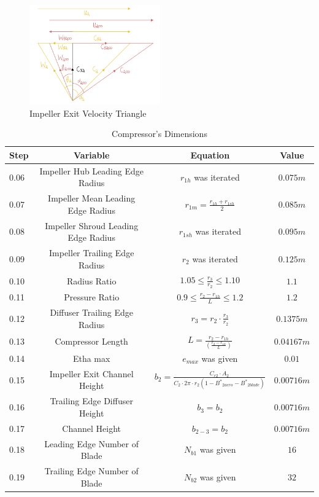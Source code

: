 \documentclass[12pt, letter]{report}
\begin{document}
\begin{figure}[H]
    \centering
    \includegraphics[width=0.5\textwidth]{figures/Impeller Exit Velocity Triangle.png}
    \caption{Impeller Exit Velocity Triangle \cite{lectureslides}}
    \label{fig:ImpellerExitVelocityTriangle}
\end{figure}

\begin{table}[H]
    \centering
    \caption{Compressor's Dimensions  \cite{lectureslides}}
    \begin{tabular}{|l|c|c|c|} \hline 
          \textbf{Step} &\textbf{Variable}&  \textbf{Equation}& \textbf{Value}\\ \hline 
         0.06&  Impeller Hub Leading Edge Radius&  $r_{1h}$ was iterated& $0.075m$\\ \hline 
         0.07&  Impeller Mean Leading Edge Radius&  $r_{1m}=\frac{r_{1h}+r_{1sh}}{2}$& $0.085m$\\ \hline 
         0.08&  Impeller Shroud Leading Edge Radius&  $r_{1sh}$ was iterated& $0.095m$\\ \hline 
         0.09&  Impeller Trailing Edge Radius&  $r_{2}$ was iterated& $0.125m$\\ \hline 
         0.10&  Radius Ratio&  $1.05\leq \frac{r_{3}}{r_{2}} \leq1.10$& $1.1$\\ \hline 
 0.11& Pressure Ratio& $0.9\leq\frac{r_{2}-r_{1h}}{L}\leq1.2$& $1.2$\\ \hline 
 0.12 & Diffuser Trailing Edge Radius & $r_{3}=r_{2} \cdot \frac{r_{3}}{r_{2}}$ & $0.1375m$\\ \hline 
0.13 & Compressor Length & $L=\frac{r_{2}-r_{1h}}{(\frac{r_{2}-r_{1h}}{L})}$& $0.04167m$\\ \hline 
0.14 & Etha max & $e_{max}$ was given& $0.01$\\ \hline 
0.15 & Impeller Exit Channel Height & $b_2= \frac{C_{r2} \cdot A_2}{C_2 \cdot2\pi \cdot r_2 (1-{B^*}_{2aero}-{B^*}_{2blade})}$& $0.00716m$\\ \hline 
0.16 & Trailing Edge Diffuser Height & $b_3=b_2$& $0.00716m$\\ \hline 
0.17 & Channel Height & $b_{2-3}=b_2$& $0.00716m$\\ \hline 
0.18 & Leading Edge Number of Blade & $N_{b1}$ was given& $16$\\ \hline 
0.19 & Trailing Edge Number of Blade & $N_{b2}$ was given& $32$\\ \hline
    \end{tabular}
    
    \label{Compressor's Dimensions}
\end{table}
\end{document}
